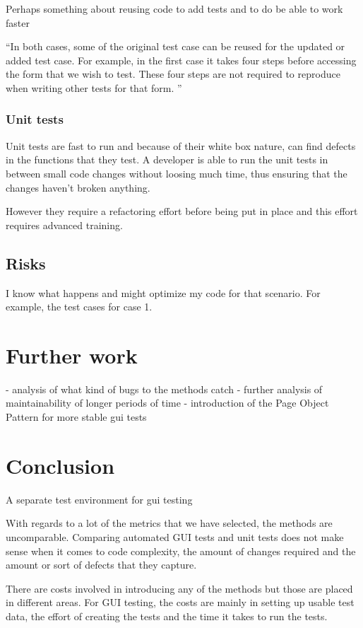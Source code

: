 \documentclass{article}
\begin{document}
			Perhaps something about reusing code to add tests and to do be able to work faster

			``In both cases, some of the original test case can be reused for the updated or added test case. For example, in the first case it takes four steps before accessing the form that we wish to test. These four steps are not required to reproduce when writing other tests for that form.
			''

			\subsubsection{Unit tests}
			Unit tests are fast to run and because of their white box nature, can find defects in the functions that they test. A developer is able to run the unit tests in between small code changes without loosing much time, thus ensuring that the changes haven't broken anything. 

			However they require a refactoring effort before being put in place and this effort requires advanced training. 

		\subsection{Risks}
		I know what happens and might optimize my code for that scenario. For example, the test cases for case 1. 

	\section{Further work}
	- analysis of what kind of bugs to the methods catch
	- further analysis of maintainability of longer periods of time 
	- introduction of the Page Object Pattern for more stable gui tests

	\section{Conclusion}
		A separate test environment for gui testing

		With regards to a lot of the metrics that we have selected, the methods are uncomparable. Comparing automated GUI tests and unit tests does not make sense when it comes to code complexity, the amount of changes required and the amount or sort of defects that they capture. 

		There are costs involved in introducing any of the methods but those are placed in different areas. For GUI testing, the costs are mainly in setting up usable test data, the effort of creating the tests and the time it takes to run the tests.
\end{document}
